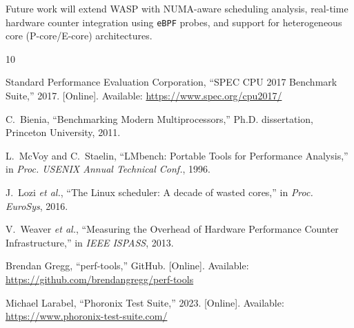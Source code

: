 \documentclass[conference]{IEEEtran}
\begin{document}
Future work will extend WASP with NUMA-aware scheduling analysis, real-time
hardware counter integration using \texttt{eBPF} probes, and support for
heterogeneous core (P-core/E-core) architectures.

\balance
\begin{thebibliography}{10}

Standard Performance Evaluation Corporation,
``SPEC CPU 2017 Benchmark Suite,'' 2017.
[Online]. Available: \url{https://www.spec.org/cpu2017/}

C.~Bienia, ``Benchmarking Modern Multiprocessors,''
Ph.D. dissertation, Princeton University, 2011.

L.~McVoy and C.~Staelin,
``LMbench: Portable Tools for Performance Analysis,''
in \textit{Proc. USENIX Annual Technical Conf.}, 1996.

J.~Lozi \textit{et al.},
``The Linux scheduler: A decade of wasted cores,''
in \textit{Proc. EuroSys}, 2016.

V.~Weaver \textit{et al.},
``Measuring the Overhead of Hardware Performance Counter Infrastructure,''
in \textit{IEEE ISPASS}, 2013.

Brendan Gregg, ``perf-tools,'' GitHub.
[Online]. Available: \url{https://github.com/brendangregg/perf-tools}

Michael Larabel, ``Phoronix Test Suite,'' 2023.
[Online]. Available: \url{https://www.phoronix-test-suite.com/}

\end{thebibliography}
\end{document}
